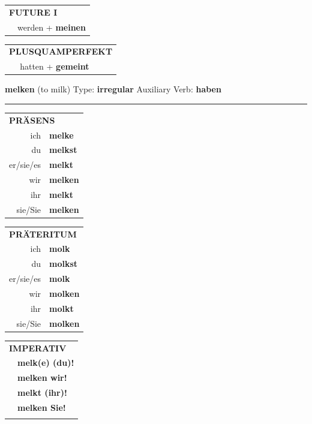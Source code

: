 \documentclass[10pt,a4paper]{revtex4-2}
\begin{document}
\begin{verbbox-acc}
\begin{tabular}{rl}
    \multicolumn{2}{l}{\textbf{FUTURE I} }\\
   & werden + \textbf{meinen}\\
 
  \end{tabular}
\hfill
   \begin{tabular}{rl}
      \multicolumn{2}{l}{\textbf{PLUSQUAMPERFEKT}}\\
   & hatten + \textbf{gemeint}\\
  \end{tabular}
  
  \vspace{-5pt}


\end{verbbox-acc}

\begin{verbbox}
    {\Large \bf melken} (to milk) \hfill Type: \textbf{irregular} \hfill Auxiliary Verb: \textbf{haben} 
    
     \vspace{5pt}

    \hrule
    
    \vspace{5pt}

  \begin{tabular}{rl}
     \multicolumn{2}{l}{\textbf{PRÄSENS} }\\
    ich & \textbf{melke}\\
    du & \textbf{melkst}\\
    er/sie/es & \textbf{melkt}\\
    wir & \textbf{melken}\\
    ihr & \textbf{melkt}\\
    sie/Sie & \textbf{melken}\\
  \end{tabular}
  \hfill
     \begin{tabular}{rl}
    \multicolumn{2}{l}{\textbf{PRÄTERITUM} }\\
    ich & \textbf{molk}\\
    du & \textbf{molkst}\\
    er/sie/es & \textbf{molk}\\
    wir & \textbf{molken}\\
    ihr & \textbf{molkt}\\
    sie/Sie & \textbf{molken}\\
  \end{tabular}
  \hfill
  \begin{tabular}{rl}
     \multicolumn{2}{l}{\textbf{IMPERATIV} }\\
   & \textbf{melk(e) (du)!}\\
   & \textbf{melken wir!}\\
   & \textbf{melkt (ihr)!}\\
   & \textbf{melken Sie!}\\
   & \vspace{10pt}
  \end{tabular}


\end{verbbox}
\end{document}
